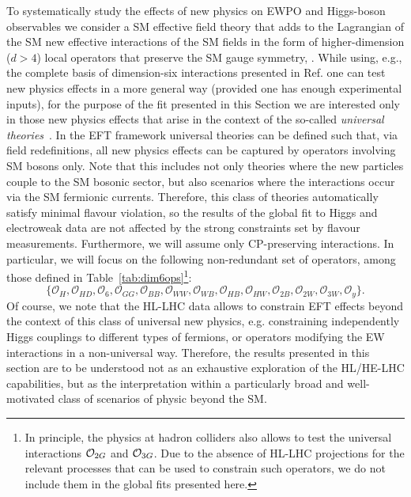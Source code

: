 To systematically study the effects of new physics on EWPO and
Higgs-boson observables we consider a SM effective field theory
 that adds to the Lagrangian of the SM new effective
interactions of the SM fields in the form of higher-dimension ($d>4$)
local operators that preserve the SM gauge symmetry, .
While using, e.g., the
complete basis of dimension-six interactions presented in
Ref. \cite{Grzadkowski:2010es} one can test new physics effects in 
a more general way (provided one has enough experimental inputs),
for the purpose of the fit presented in this Section we are interested only in those
new physics effects that arise in the context of the so-called {\it universal theories}~\cite{Barbieri:2004qk,Wells:2015uba}.
In the EFT framework universal theories can be defined such that, via field redefinitions, all new physics effects
can be captured by operators involving SM bosons only. Note that this includes not only theories where the
new particles couple to the SM bosonic sector, but also scenarios where the interactions 
occur via the SM fermionic currents. Therefore, this class of theories automatically 
satisfy minimal flavour violation, so the results of the global fit to Higgs and electroweak data 
are not affected by the strong constraints set by flavour measurements. Furthermore,
we will assume only CP-preserving interactions. 
In particular, we will focus on the following non-redundant set of operators, among those defined in Table~\ref{tab:dim6ops}\footnote{In principle, the physics at hadron colliders also allows to test the universal interactions ${\cal O}_{2G}$ and ${\cal O}_{3G}$. Due to the absence of HL-LHC projections for the relevant processes that can be used to constrain such operators, we do not include them in the global fits presented here.}: 
%
\begin{equation}
\label{eq:universal}
%
\{\mathcal{O}_{H}, \mathcal{O}_{H D} ,
\mathcal{O}_{6} ,
\mathcal{O}_{G G} ,
\mathcal{O}_{B B} ,
\mathcal{O}_{W W} ,
\mathcal{O}_{W B} ,
\mathcal{O}_{HB} ,
\mathcal{O}_{HW} ,
\mathcal{O}_{2B} ,
\mathcal{O}_{2W} ,
\mathcal{O}_{3W} ,
\mathcal{O}_{y} \}.
\end{equation}
%
Of course, we note that the HL-LHC data allows to constrain EFT effects beyond the context of this class of universal new physics, 
e.g. constraining independently Higgs couplings to different types of fermions, or operators modifying the EW interactions
in a non-universal way. Therefore, the results presented in this section are to be understood not as an exhaustive exploration 
of the HL/HE-LHC capabilities, but as the interpretation within a particularly broad and well-motivated class
of scenarios of physic beyond the SM.


